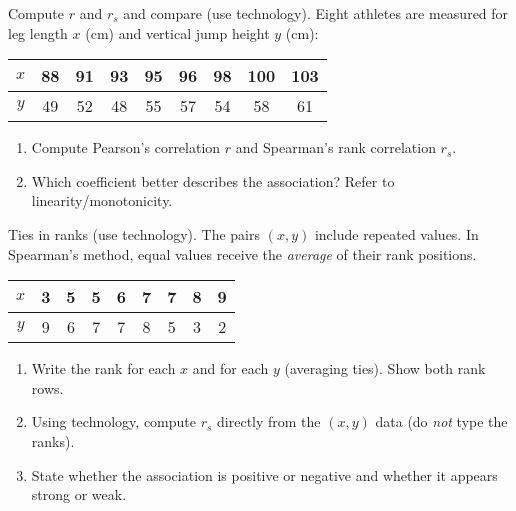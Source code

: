 \documentclass[11pt]{article}
\def\textbf#1{#1}%
\newcounter{question}
\begin{document}
\begin{question}
\textbf{Compute $r$ and $r_s$ and compare (use technology).}
Eight athletes are measured for leg length $x$ (cm) and vertical jump height $y$ (cm):
\begin{center}
\begin{tabular}{c|cccccccc}
$x$ & 88 & 91 & 93 & 95 & 96 & 98 & 100 & 103\\\hline
$y$ & 49 & 52 & 48 & 55 & 57 & 54 & 58  & 61
\end{tabular}
\end{center}
\begin{enumerate}
  \item Compute Pearson’s correlation $r$ and Spearman’s rank correlation $r_s$.
  \item Which coefficient better describes the association? Refer to linearity/monotonicity.
\end{enumerate}
\begin{center}
\end{center}
\end{question}

\begin{question}
\textbf{Ties in ranks (use technology).}
The pairs $(x,y)$ include repeated values. In Spearman’s method, equal values receive the \emph{average} of their rank positions.
\begin{center}
\begin{tabular}{c|cccccccc}
$x$ & 3 & 5 & 5 & 6 & 7 & 7 & 8 & 9\\\hline
$y$ & 9 & 6 & 7 & 7 & 8 & 5 & 3 & 2
\end{tabular}
\end{center}
\begin{enumerate}
  \item Write the rank for each $x$ and for each $y$ (averaging ties). Show both rank rows.
  \item Using technology, compute $r_s$ directly from the $(x,y)$ data (do \emph{not} type the ranks).
  \item State whether the association is positive or negative and whether it appears strong or weak.
\end{enumerate}
\begin{center}
\end{center}
\end{question}
\end{document}
